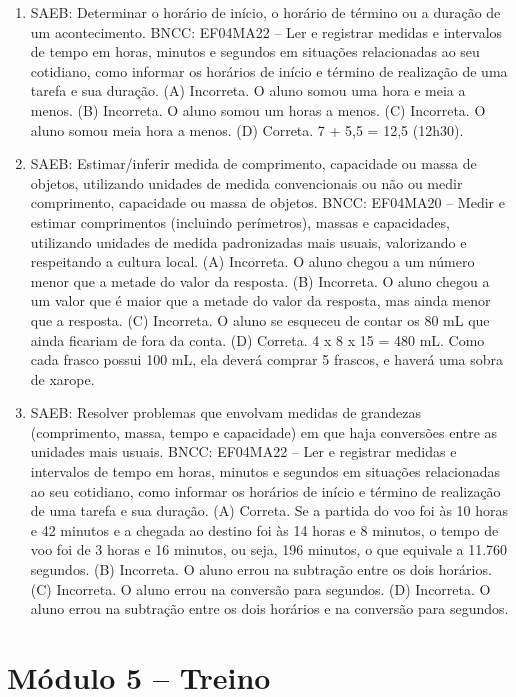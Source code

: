 \begin{enumerate}
\item
SAEB: Determinar o horário de início, o horário de término ou a duração de um acontecimento.
BNCC: EF04MA22 -- Ler e registrar medidas e intervalos de tempo em horas, minutos e segundos em
situações relacionadas ao seu cotidiano, como informar os horários de início e término de realização
de uma tarefa e sua duração.
(A) Incorreta. O aluno somou uma hora e meia a menos.
(B) Incorreta. O aluno somou um horas a menos.
(C) Incorreta. O aluno somou meia hora a menos.
(D) Correta. 7 + 5,5 = 12,5 (12h30).

\item
SAEB: Estimar/inferir medida de comprimento, capacidade ou massa de objetos, utilizando unidades de medida convencionais ou não ou medir comprimento, capacidade ou massa de objetos.
BNCC: EF04MA20 -- Medir e estimar comprimentos (incluindo perímetros), massas e capacidades, utilizando
unidades de medida padronizadas mais usuais, valorizando e respeitando a cultura local.
(A) Incorreta. O aluno chegou a um número menor que a metade do valor da resposta.
(B) Incorreta. O aluno chegou a um valor que é maior que a metade do valor da resposta, mas ainda menor que a resposta.
(C) Incorreta. O aluno se esqueceu de contar os 80 mL que ainda ficariam de fora da conta.
(D) Correta. 4 x 8 x 15 = 480 mL. Como cada frasco possui 100 mL, ela deverá
comprar 5 frascos, e haverá uma sobra de xarope.

\item
SAEB: Resolver problemas que envolvam medidas de grandezas (comprimento, massa, tempo e capacidade) em que haja conversões entre as unidades mais usuais.
BNCC: EF04MA22 -- Ler e registrar medidas e intervalos de tempo em horas, minutos e segundos em
situações relacionadas ao seu cotidiano, como informar os horários de início e término de realização
de uma tarefa e sua duração.
(A) Correta. Se a partida do voo foi às 10 horas e 42 minutos e a chegada ao destino foi às 14 horas e 8 minutos, o tempo de voo foi de 3 horas e 16 minutos, ou seja, 196 minutos, o que equivale a 11.760 segundos.
(B) Incorreta. O aluno errou na subtração entre os dois horários.
(C) Incorreta. O aluno errou na conversão para segundos.
(D) Incorreta. O aluno errou na subtração entre os dois horários e na conversão para segundos.
\end{enumerate}

\section*{Módulo 5 – Treino}

